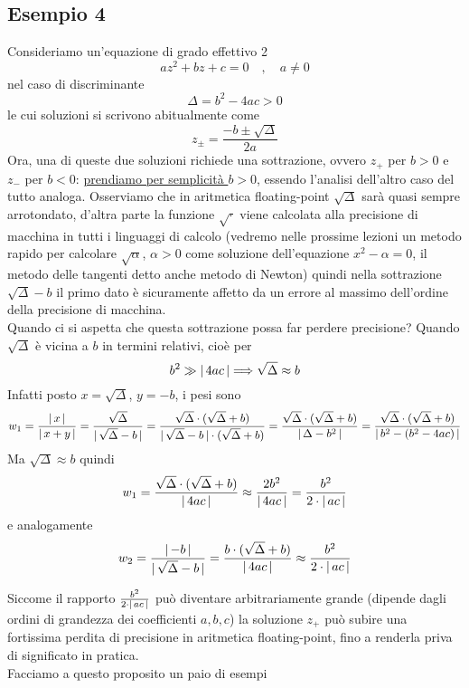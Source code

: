 \documentclass[12pt]{article}
\DeclarePairedDelimiter{\abs}{\lvert}{\rvert}
\begin{document}
\subsection{Esempio 4}
Consideriamo un’equazione di grado effettivo 2 \[az^2+bz+c=0 \quad , \quad a \ne 0\]
nel caso di discriminante \[\Delta = b^2 -4ac >0\] 
le cui soluzioni si scrivono abitualmente come \[z_{\pm} = \frac{-b \pm \sqrt{\Delta}}{2a}\]
Ora, una di queste due soluzioni richiede una sottrazione, ovvero $z_+$ per $b>0$ e $z_-$ per $b <0 $: \uline{prendiamo per semplicità $b>0$}, essendo l’analisi dell'altro caso del tutto analoga. Osserviamo che in aritmetica floating-point $\sqrt{\Delta}$ sarà quasi sempre arrotondato, d’altra parte la funzione $\sqrt{\cdot}$ viene calcolata alla precisione di macchina in tutti i linguaggi di calcolo (vedremo nelle prossime lezioni un metodo rapido per calcolare $\sqrt{\alpha}$, $\alpha>0$ come soluzione dell'equazione $x^2-\alpha = 0$, il metodo delle tangenti detto anche metodo di Newton) quindi nella sottrazione $\sqrt{\Delta} -b$ il primo dato è sicuramente affetto da un errore al massimo dell'ordine della precisione di macchina.\\
Quando ci si aspetta che questa sottrazione possa far perdere precisione? Quando $\sqrt{\Delta}$ è vicina a $b$ in termini relativi, cioè per 
\[b^2 \gg \abs{\,4ac\,} \Longrightarrow \sqrt{\Delta} \approx b\]
Infatti posto $x = \sqrt{\Delta}$, $y = -b$, i pesi sono
\[w_1 = \frac{\abs{\,x\,}}{\abs{\,x+y\,}} = \frac{\sqrt{\Delta}}{\abs{\,\sqrt{\Delta}-b\,}} = \frac{\sqrt{\Delta}\cdot (\sqrt{\Delta}+b)}{\abs{\,\sqrt{\Delta}-b\,}\cdot (\sqrt{\Delta}+b)} = \frac{\sqrt{\Delta}\cdot (\sqrt{\Delta}+b)}{\abs{\,\Delta - b^2\,}} = \frac{\sqrt{\Delta}\cdot (\sqrt{\Delta}+b)}{\abs{\,b^2 - (b^2-4ac)\,}}\]
Ma $\sqrt{\Delta} \approx b$ quindi
\[w_1 = \frac{\sqrt{\Delta}\cdot (\sqrt{\Delta}+b)}{\abs{\,4ac\,}} \approx \frac{2b^2}{\abs{\,4ac\,}} = \frac{b^2}{2 \cdot\abs{\,ac\,}}\]
e analogamente
\[w_2 = \frac{\abs{\,-b\,}}{\abs{\,\sqrt{\Delta}-b\,}} = \frac{b\cdot (\sqrt{\Delta}+b)}{\abs{\,4ac\,}} \approx \frac{b^2}{2 \cdot\abs{\,ac\,}}\]

Siccome il rapporto $\frac{b^2}{2 \cdot\abs{\,ac\,}}$ può diventare arbitrariamente grande (dipende dagli ordini di grandezza dei coefficienti $a, b, c$) la soluzione $z_+$ può subire una fortissima perdita di precisione in aritmetica floating-point, fino a renderla priva di significato in pratica.\\ 
Facciamo a questo proposito un paio di esempi 
\end{document}
